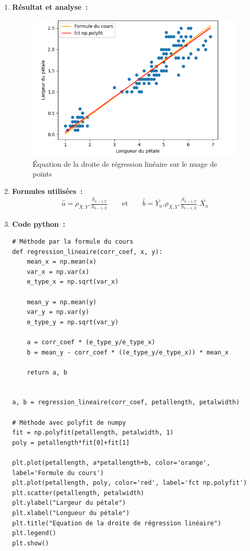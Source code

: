 \begin{enumerate}
    \item \textbf{Résultat et analyse~:}
        \begin{figure}[!h]
            \centering
            \includegraphics[width=.6\textwidth]{img/Figure_2.png}
            \caption{\label{fig:figure2}Équation de la droite de régression linéaire sur le nuage de points}
        \end{figure}

    \item \textbf{Formules utilisées~:}
        \begin{gather}
            \hat{a} = \rho_{X,Y}.\frac{S_{n-1,Y}}{S_{n-1,X}} \qquad \text{et} \qquad \hat{b} = \overline{Y_{n}}.\rho_{X,Y}.\frac{S_{n-1,Y}}{S_{n-1,X}}.\overline{X_{n}}
        \end{gather}

        \vspace{.5cm}

    \item \textbf{Code python~:}
        \begin{lstlisting}[style=myPython, caption=Code Python pour tracer la droite de régression linéaire, frame=lines]
# Méthode par la formule du cours
def regression_lineaire(corr_coef, x, y):
    mean_x = np.mean(x)
    var_x = np.var(x)
    e_type_x = np.sqrt(var_x)

    mean_y = np.mean(y)
    var_y = np.var(y)
    e_type_y = np.sqrt(var_y)

    a = corr_coef * (e_type_y/e_type_x)
    b = mean_y - corr_coef * ((e_type_y/e_type_x)) * mean_x

    return a, b


a, b = regression_lineaire(corr_coef, petallength, petalwidth)

# Méthode avec polyfit de numpy
fit = np.polyfit(petallength, petalwidth, 1)
poly = petallength*fit[0]+fit[1]

plt.plot(petallength, a*petallength+b, color='orange', label='Formule du cours')
plt.plot(petallength, poly, color='red', label='fct np.polyfit')
plt.scatter(petallength, petalwidth)
plt.ylabel("Largeur du pétale")
plt.xlabel("Longueur du pétale")
plt.title("Equation de la droite de régression linéaire")
plt.legend()
plt.show()
        \end{lstlisting}
    
    \vspace{.2cm}
\end{enumerate}









